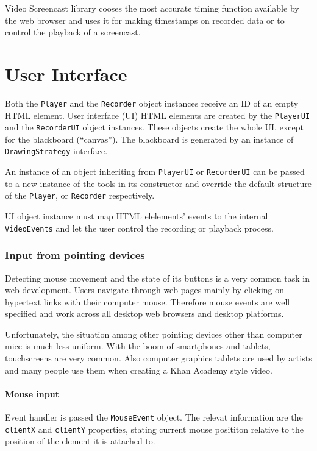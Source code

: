 Video Screencast library cooses the most accurate timing function available by the web browser and uses it for making timestamps on recorded data or to control the playback of a screencast.




\section{User Interface}
Both the \verb|Player| and the \verb|Recorder| object instances receive an ID of an empty HTML element. User interface (UI)  HTML elements are created by the \verb|PlayerUI| and the \verb|RecorderUI| object instances. These objects create the whole UI, except for the blackboard (``canvas''). The blackboard is generated by an instance of \verb|DrawingStrategy| interface.

An instance of an object inheriting from \verb|PlayerUI| or \verb|RecorderUI| can be passed to a new instance of the tools in its constructor and override the default structure of the \verb|Player|, or \verb|Recorder| respectively.

UI object instance must map HTML elelements' events to the internal \verb|VideoEvents| and let the user control the recording or playback process.




\subsubsection{Input from pointing devices}

Detecting mouse movement and the state of its buttons is a very common task in web development. Users navigate through web pages mainly by clicking on hypertext links with their computer mouse. Therefore mouse events are well specified and work across all desktop web browsers and desktop platforms.

Unfortunately, the situation among other pointing devices other than computer mice is much less uniform. With the boom of smartphones and tablets, touchscreens are very common. Also computer graphics tablets are used by artists and many people use them when creating a Khan Academy style video.

\paragraph{Mouse input}
Event handler is passed the \verb|MouseEvent| object. The relevat information are the \verb|clientX| and \verb|clientY| properties, stating current mouse posititon relative to the position of the element it is attached to. 

